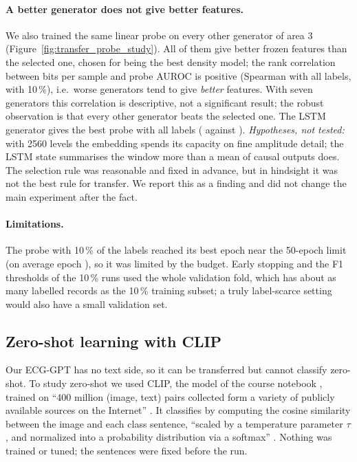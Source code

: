 

\paragraph{A better generator does not give better features.} We also trained the same linear probe
on every other generator of area 3 (Figure~\ref{fig:transfer_probe_study}). All of them give better
frozen features than the selected one, chosen for being the best density model; the rank correlation
between bits per sample and probe AUROC is positive (Spearman \transferProbeSpearmanFOneZeroZero{}
with all labels, \transferProbeSpearmanFOneZero{} with 10\,\%), i.e.\ worse generators tend to give
\emph{better} features. With seven generators this correlation is descriptive, not a significant
result; the robust observation is that every other generator beats the selected one. The LSTM generator gives the best probe with all labels
(\transferValAurocMeanProbeLstmFOneZeroZero{} against \transferValAurocMeanProbeFOneZeroZero{}).
\emph{Hypotheses, not tested:} with 2560 levels the embedding spends its capacity on fine amplitude
detail; the LSTM state summarises the window more than a mean of causal outputs does. The selection
rule was reasonable and fixed in advance, but in hindsight it was not the best rule for transfer. We
report this as a finding and did not change the main experiment after the fact.



\paragraph{Limitations.} The probe with 10\,\% of the labels reached its best epoch near the 50-epoch
limit (on average epoch \intval{\transferBestEpochMeanProbeFOneZero}), so it was limited by the
budget. Early stopping and the F1 thresholds of the 10\,\% runs used the whole validation fold, which
has about as many labelled records as the 10\,\% training subset; a truly label-scarce setting would
also have a small validation set.

\subsection{Zero-shot learning with CLIP}

Our ECG-GPT has no text side, so it can be transferred but cannot classify zero-shot. To study
zero-shot we used CLIP, the model of the course notebook \cite{course_nb_clip}, trained on ``400
million (image, text) pairs collected form a variety of publicly available sources on the Internet''
\cite[p.~3]{radford2021learning}. It classifies by computing the cosine similarity between the image
and each class sentence, ``scaled by a temperature parameter $\tau$, and normalized into a probability
distribution via a softmax'' \cite[p.~6]{radford2021learning}. Nothing was trained or tuned; the
sentences were fixed before the run.

